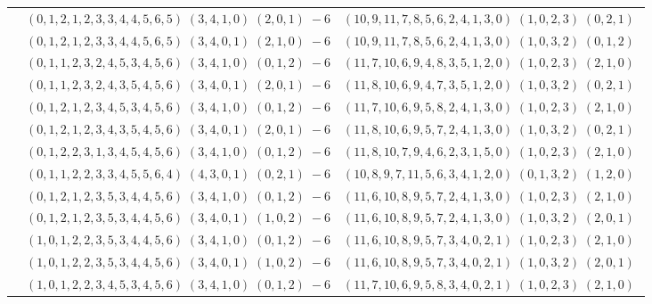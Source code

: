 \documentclass[11pt]{article}
\begin{document}
\begin{longtable}[l]{|c|c|c|}
 \cline{2-3} 
 & $(0 ,1 ,2 ,1 ,2 ,3 ,3 ,4 ,4 ,5 ,6 ,5) \;(3 ,4 ,1 ,0) \;(2 ,0 ,1) \;-6$ & $(10 ,9 ,11 ,7 ,8 ,5 ,6 ,2 ,4 ,1 ,3 ,0) \;(1 ,0 ,2 ,3) \;(0 ,2 ,1) \;$\\ 
 \cline{2-3} 
 & $(0 ,1 ,2 ,1 ,2 ,3 ,3 ,4 ,4 ,5 ,6 ,5) \;(3 ,4 ,0 ,1) \;(2 ,1 ,0) \;-6$ & $(10 ,9 ,11 ,7 ,8 ,5 ,6 ,2 ,4 ,1 ,3 ,0) \;(1 ,0 ,3 ,2) \;(0 ,1 ,2) \;$\\ 
 \cline{2-3} 
 & $(0 ,1 ,1 ,2 ,3 ,2 ,4 ,5 ,3 ,4 ,5 ,6) \;(3 ,4 ,1 ,0) \;(0 ,1 ,2) \;-6$ & $(11 ,7 ,10 ,6 ,9 ,4 ,8 ,3 ,5 ,1 ,2 ,0) \;(1 ,0 ,2 ,3) \;(2 ,1 ,0) \;$\\ 
 \cline{2-3} 
 & $(0 ,1 ,1 ,2 ,3 ,2 ,4 ,3 ,5 ,4 ,5 ,6) \;(3 ,4 ,0 ,1) \;(2 ,0 ,1) \;-6$ & $(11 ,8 ,10 ,6 ,9 ,4 ,7 ,3 ,5 ,1 ,2 ,0) \;(1 ,0 ,3 ,2) \;(0 ,2 ,1) \;$\\ 
 \cline{2-3} 
 & $(0 ,1 ,2 ,1 ,2 ,3 ,4 ,5 ,3 ,4 ,5 ,6) \;(3 ,4 ,1 ,0) \;(0 ,1 ,2) \;-6$ & $(11 ,7 ,10 ,6 ,9 ,5 ,8 ,2 ,4 ,1 ,3 ,0) \;(1 ,0 ,2 ,3) \;(2 ,1 ,0) \;$\\ 
 \cline{2-3} 
 & $(0 ,1 ,2 ,1 ,2 ,3 ,4 ,3 ,5 ,4 ,5 ,6) \;(3 ,4 ,0 ,1) \;(2 ,0 ,1) \;-6$ & $(11 ,8 ,10 ,6 ,9 ,5 ,7 ,2 ,4 ,1 ,3 ,0) \;(1 ,0 ,3 ,2) \;(0 ,2 ,1) \;$\\ 
 \cline{2-3} 
 & $(0 ,1 ,2 ,2 ,3 ,1 ,3 ,4 ,5 ,4 ,5 ,6) \;(3 ,4 ,1 ,0) \;(0 ,1 ,2) \;-6$ & $(11 ,8 ,10 ,7 ,9 ,4 ,6 ,2 ,3 ,1 ,5 ,0) \;(1 ,0 ,2 ,3) \;(2 ,1 ,0) \;$\\ 
 \cline{2-3} 
 & $(0 ,1 ,1 ,2 ,2 ,3 ,3 ,4 ,5 ,5 ,6 ,4) \;(4 ,3 ,0 ,1) \;(0 ,2 ,1) \;-6$ & $(10 ,8 ,9 ,7 ,11 ,5 ,6 ,3 ,4 ,1 ,2 ,0) \;(0 ,1 ,3 ,2) \;(1 ,2 ,0) \;$\\ 
 \cline{2-3} 
 & $(0 ,1 ,2 ,1 ,2 ,3 ,5 ,3 ,4 ,4 ,5 ,6) \;(3 ,4 ,1 ,0) \;(0 ,1 ,2) \;-6$ & $(11 ,6 ,10 ,8 ,9 ,5 ,7 ,2 ,4 ,1 ,3 ,0) \;(1 ,0 ,2 ,3) \;(2 ,1 ,0) \;$\\ 
 \cline{2-3} 
 & $(0 ,1 ,2 ,1 ,2 ,3 ,5 ,3 ,4 ,4 ,5 ,6) \;(3 ,4 ,0 ,1) \;(1 ,0 ,2) \;-6$ & $(11 ,6 ,10 ,8 ,9 ,5 ,7 ,2 ,4 ,1 ,3 ,0) \;(1 ,0 ,3 ,2) \;(2 ,0 ,1) \;$\\ 
 \cline{2-3} 
 & $(1 ,0 ,1 ,2 ,2 ,3 ,5 ,3 ,4 ,4 ,5 ,6) \;(3 ,4 ,1 ,0) \;(0 ,1 ,2) \;-6$ & $(11 ,6 ,10 ,8 ,9 ,5 ,7 ,3 ,4 ,0 ,2 ,1) \;(1 ,0 ,2 ,3) \;(2 ,1 ,0) \;$\\ 
 \cline{2-3} 
 & $(1 ,0 ,1 ,2 ,2 ,3 ,5 ,3 ,4 ,4 ,5 ,6) \;(3 ,4 ,0 ,1) \;(1 ,0 ,2) \;-6$ & $(11 ,6 ,10 ,8 ,9 ,5 ,7 ,3 ,4 ,0 ,2 ,1) \;(1 ,0 ,3 ,2) \;(2 ,0 ,1) \;$\\ 
 \cline{2-3} 
 & $(1 ,0 ,1 ,2 ,2 ,3 ,4 ,5 ,3 ,4 ,5 ,6) \;(3 ,4 ,1 ,0) \;(0 ,1 ,2) \;-6$ & $(11 ,7 ,10 ,6 ,9 ,5 ,8 ,3 ,4 ,0 ,2 ,1) \;(1 ,0 ,2 ,3) \;(2 ,1 ,0) \;$\\ 

\end{longtable}
\end{document}

